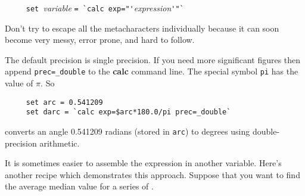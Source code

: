 \verb#     set #{\em variable} \verb#= `calc exp="'#{\em expression}\verb#'"`#

Don't try to escape all the metacharacters individually because it can
soon become very messy, error prone, and hard to follow.
\medskip

The default precision is single precision.  If you need more
significant figures then append {\tt prec=\_double} to the {\bf calc}
command line.  The special symbol {\tt pi} has the value of $\pi$.  So

\small
\begin{verbatim}
     set arc = 0.541209
     set darc = `calc exp=$arc*180.0/pi prec=_double`
\end{verbatim}
\normalsize
converts an angle 0.541209 radians (stored in {\tt arc}) to degrees
using double-precision arithmetic.

It is sometimes easier to assemble the expression in another variable.
Here's another recipe which demonstrates this approach.  Suppose that you
want to find the average median value for a series of .

